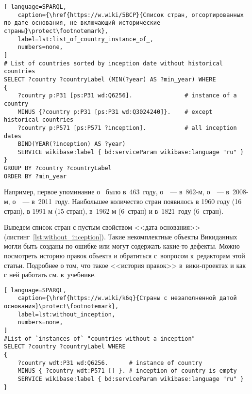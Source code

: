 \begin{lstlisting}[ language=SPARQL, 
    caption={\href{https://w.wiki/5BCP}{Список стран, отсортированных по дате основания, не включающий исторические страны}\protect\footnotemark},
    label=lst:list_of_country_instance_of_, 
    numbers=none,
]
# List of countries sorted by inception date without historical countries
SELECT ?country ?countryLabel (MIN(?year) AS ?min_year) WHERE
{
	?country p:P31 [ps:P31 wd:Q6256].               # instance of a country 
	MINUS {?country p:P31 [ps:P31 wd:Q3024240]}.    # except historical countries
	?country p:P571 [ps:P571 ?inception].           # all inception dates
	BIND(YEAR(?inception) AS ?year)
	SERVICE wikibase:label { bd:serviceParam wikibase:language "ru" }
}
GROUP BY ?country ?countryLabel
ORDER BY ?min_year
\end{lstlisting}


Например, первое упоминание о~ было в~463~году, 
о~~--- в~862-м, 
о~~--- в~2008-м, 
о~~--- в~2011~году. 
Наибольшее количество стран появилось в 1960 году (16 стран), 
в 1991-м (15 стран), в~1962-м (6~стран) и в~1821~году (6~стран).


\newpage
Выведем список стран с пустым свойством <<дата основания>> (листинг~\ref{lst:without_inception}). 
Такие некомплектные объекты Викиданных могли быть созданы по ошибке или могут содержать какие-то дефекты. 
Можно посмотреть историю правок объекта и обратиться с~вопросом к~редакторам этой статьи. 
Подробнее о том, что такое <<история правок>> в~вики-проектах 
и как с ней работать см. в~учебнике.

\begin{lstlisting}[ language=SPARQL, 
    caption={\href{https://w.wiki/k6q}{Страны с незаполненной датой основания}\protect\footnotemark},
    label=lst:without_inception,
    numbers=none,
]
#List of `instances of` "countries without a inception" 
SELECT ?country ?countryLabel WHERE
{
    ?country wdt:P31 wd:Q6256.      # instance of country
    MINUS { ?country wdt:P571 [] }. # inception of country is empty
    SERVICE wikibase:label { bd:serviceParam wikibase:language "ru" }
}
\end{lstlisting}




